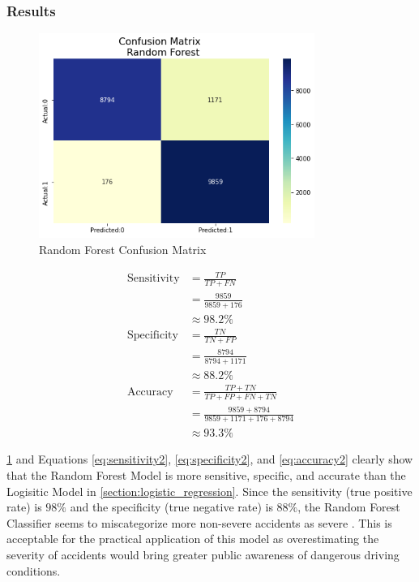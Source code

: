 \subsubsection{Results}
\begin{figure}[H]
    \centering
    \includegraphics[width=90mm,height=\textheight,keepaspectratio]{images/rf_conf_matrix.png}
    \caption{Random Forest Confusion Matrix}
    \label{fig:rf_conf_matrix}
\end{figure}

\begin{align}
    \text{Sensitivity} &= \frac{TP}{TP + FN} \\ \label{eq:sensitivity2}
    &= \frac{9859}{9859 + 176} \\
    &\approx 98.2\% \\
    \text{Specificity} &= \frac{TN}{TN + FP} \\ \label{eq:specificity2}
    &= \frac{8794}{8794 + 1171} \\
    &\approx 88.2\% \\
    \text{Accuracy} &= \frac{TP + TN}{TP + FP + FN + TN} \\ \label{eq:accuracy2}
    &= \frac{9859 + 8794}{9859 + 1171 + 176 + 8794} \\
    &\approx 93.3\% 
\end{align}

\cref{fig:rf_conf_matrix} and Equations \ref{eq:sensitivity2}, \ref{eq:specificity2}, and \ref{eq:accuracy2} clearly show that the Random Forest Model is more sensitive, specific, and accurate than the Logisitic Model in \cref{section:logistic_regression}. Since the sensitivity (true positive rate) is \(98\%\) and the specificity (true negative rate) is \(88\%\), the Random Forest Classifier seems to miscategorize more non-severe accidents as severe \citep{zhu2010sensitivity}. This is acceptable for the practical application of this model as overestimating the severity of accidents would bring greater public awareness of dangerous driving conditions.